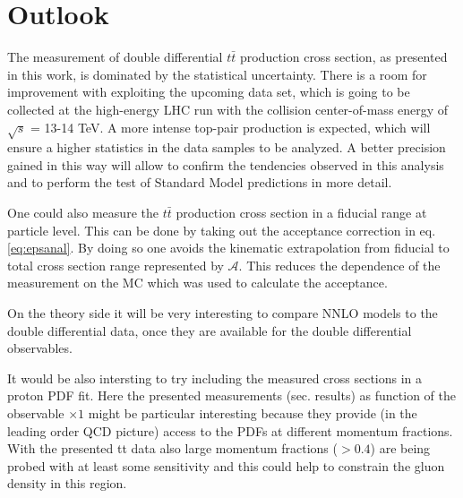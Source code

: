 \section{Outlook}

The measurement of double differential $t\bar{t}$ production cross section, as presented in this work, is dominated by the statistical
uncertainty. There is a room for improvement with exploiting the upcoming data set, which is going to be collected at the high-energy LHC
run with the collision center-of-mass energy of $\sqrt{s}$ = 13-14 TeV. A more intense top-pair production is expected, which will ensure
a higher statistics in the data samples to be analyzed. A better precision gained in this way will allow to confirm the tendencies 
observed in this analysis and to perform the test of Standard Model predictions in more detail.

One could also measure the $t\bar{t}$ production cross section in a fiducial range at particle level. This can be done by taking out the 
acceptance correction in eq. \ref{eq:epsanal}. By doing so one avoids the kinematic extrapolation from fiducial to total cross section
range represented by $\mathcal{A}$. This reduces the dependence of the measurement on the MC which was used to calculate the acceptance.

On the theory side it will be very interesting to compare NNLO models to the double differential data, once they are available for the
double differential observables.

It would be also intersting to try including the measured cross sections
in a proton PDF fit. Here the presented measurements (sec. results) as
function
of the observable $\times 1$ might be particular interesting because
they provide (in the leading order QCD picture) access to the PDFs at
different momentum fractions.
With the presented tt data also large momentum fractions ($> 0.4$) are
being probed with at least some sensitivity and this
could help to constrain the gluon density in this region.
